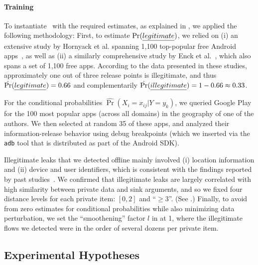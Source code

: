 \paragraph{Training} To instantiate \Tool\ with the required estimates, as explained in , we applied the following methodology:
%
First, to estimate $\Pr(\emph{legitimate})$, we relied on (i) an extensive study by Hornyack et al. spanning 1,100 top-popular free Android apps~\cite{HHJSW:CCS11}, as well as (ii) a similarly comprehensive study by Enck et al.~\cite{EOMC:SEC11}, which also spans a set of 1,100 free apps. According to the data presented in these studies, approximately one out of three release points is illegitimate, and thus $\hat{\Pr}(\emph{legitimate})=0.66$ and complementarily 
$\hat{\Pr}(\emph{illegitimate}) = 1-0.66 \approx 0.33$.

For the conditional probabilities $\hat{\Pr}(X_i = x_{ij} | Y=y_k)$,  we queried Google Play for the 100 most popular apps (across all domains) in the geography of one of the authors. We then selected at random 35 of these apps, and analyzed their information-release behavior using debug breakpoints 
(which we inserted via the {\tt adb} tool that is distributed as part of the Android SDK). 

Illegitimate leaks that we detected offline mainly involved (i) location information and (ii) device and user identifiers, which is consistent with the findings reported by past studies~\cite{HHJSW:CCS11,EOMC:SEC11}. We confirmed that illegitimate leaks are largely correlated with high similarity between private data and sink arguments, and so we fixed four distance levels for each private item: $[0,2]$ and ``$\geq 3$''. (See .) Finally, to avoid from zero estimates for conditional probabilities while also minimizing data perturbation, we set the ``smoothening'' factor $l$ in  at 1, where the illegitimate flows we detected were in the order of several dozens per private item. 

\subsection{Experimental Hypotheses}


